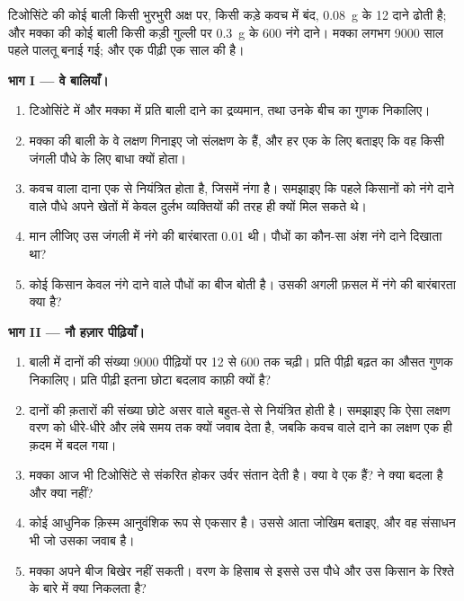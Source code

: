 \begin{problem}
\label{pb:g12:domesticated-plants:1}
टिओसिंटे की कोई बाली किसी भुरभुरी अक्ष पर, किसी कड़े कवच में बंद,
\qty{0.08}{g} के 12 दाने ढोती है; और मक्का की कोई बाली किसी कड़ी गुल्ली पर
\qty{0.3}{g} के 600 नंगे दाने। मक्का लगभग 9000 साल पहले पालतू बनाई गई; और
एक पीढ़ी एक साल की है।

\medskip
\noindent\textbf{भाग I --- वे बालियाँ।}
\begin{enumerate}
  \item टिओसिंटे में और मक्का में प्रति बाली दाने का द्रव्यमान, तथा उनके
        बीच का गुणक निकालिए।
  \item मक्का की बाली के वे लक्षण गिनाइए जो  संलक्षण के हैं, और हर
        एक के लिए बताइए कि वह किसी जंगली पौधे के लिए बाधा क्यों होता।
  \item कवच वाला दाना एक  से नियंत्रित होता है, जिसमें नंगा
          है। समझाइए कि पहले किसानों को नंगे दाने वाले
        पौधे अपने खेतों में केवल दुर्लभ व्यक्तियों की तरह ही क्यों मिल सकते
        थे।
  \item मान लीजिए उस जंगली  में नंगे  की बारंबारता 0.01
        थी। पौधों का कौन-सा अंश नंगे दाने दिखाता था?
  \item कोई किसान केवल नंगे दाने वाले पौधों का बीज बोती है। उसकी अगली
        फ़सल में नंगे  की बारंबारता क्या है?
\end{enumerate}

\medskip
\noindent\textbf{भाग II --- नौ हज़ार पीढ़ियाँ।}
\begin{enumerate}[resume]
  \item बाली में दानों की संख्या 9000 पीढ़ियों पर 12 से 600 तक चढ़ी। प्रति
        पीढ़ी बढ़त का औसत गुणक निकालिए। प्रति पीढ़ी इतना छोटा बदलाव काफ़ी
        क्यों है?
  \item दानों की क़तारों की संख्या छोटे असर वाले बहुत-से  से
        नियंत्रित होती है। समझाइए कि ऐसा लक्षण वरण को धीरे-धीरे और लंबे समय
        तक क्यों जवाब देता है, जबकि कवच वाले दाने का लक्षण एक ही क़दम में
        बदल गया।
  \item मक्का आज भी टिओसिंटे से संकरित होकर उर्वर संतान देती है। क्या वे एक
         हैं?  ने क्या बदला है और क्या नहीं?
  \item कोई आधुनिक क़िस्म आनुवंशिक रूप से एकसार है। उससे आता जोखिम बताइए,
        और वह संसाधन भी जो उसका जवाब है।
  \item मक्का अपने बीज बिखेर नहीं सकती। वरण के हिसाब से इससे उस पौधे और उस
        किसान के रिश्ते के बारे में क्या निकलता है?
\end{enumerate}


\end{problem}
